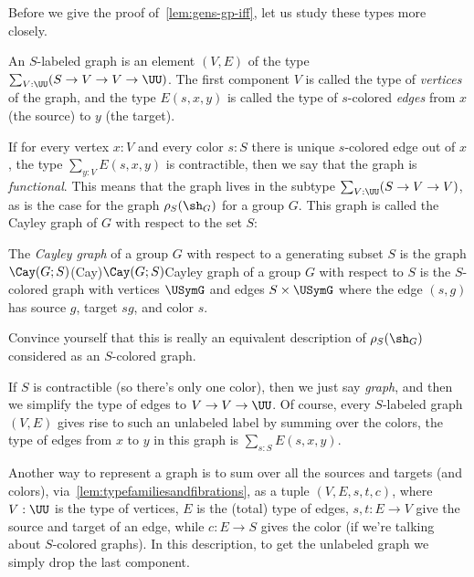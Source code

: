 Before we give the proof of~\cref{lem:gens-gp-iff}, let us study these types more closely.
\begin{definition}
  An $S$-labeled graph is an element $(V,E)$ of the type
  $\sum_{V:\UU}(S \to V \to V \to \UU)$.%
  The first component $V$ is called the type of \emph{vertices} of the graph,
  and the type $E(s,x,y)$ is called the type of $s$-colored \emph{edges}
  from $x$ (the source) to $y$ (the target).
\end{definition}
If for every vertex $x:V$ and every color $s:S$ there is unique $s$-colored edge out of $x$, \ie the type $\sum_{y:V}E(s,x,y)$ is contractible, then we say that the graph
is \emph{functional}. This means that the graph lives in the subtype $\sum_{V:\UU}(S \to V \to V)$,
as is the case for the graph $\rho_S(\sh_G)$ for a group $G$.
This graph is called the Cayley graph of $G$ with respect to the set $S$:
\begin{definition}\label{def:cayley-graph}
  The \emph{Cayley graph}
  of a group $G$ with respect to a generating subset $S$
  is the graph $\Cay(G;S)$\glossary(Cay){$\protect\Cay(G;S)$}{Cayley graph of a group $G$
  with respect to $S$}
  is the $S$-colored graph with vertices $\USymG$
  and edges $S \times \USymG$ where the edge $(s,g)$ has source $g$, target $sg$,
  and color $s$.
\end{definition}
Convince yourself that this is really an equivalent description of $\rho_S(\sh_G)$
considered as an $S$-colored graph.

If $S$ is contractible (so there's only one color), then we just say \emph{graph},
and then we simplify the type of edges to $V \to V \to \UU$.
Of course, every $S$-labeled graph $(V,E)$ gives rise to such an unlabeled label
by summing over the colors, \ie the type of edges from $x$ to $y$ in this graph
is $\sum_{s:S}E(s,x,y)$.

Another way to represent a graph is to sum over all the sources and targets (and colors),
via~\cref{lem:typefamiliesandfibrations},
\ie as a tuple $(V,E,s,t,c)$, where $V:\UU$ is the type of vertices,
$E$ is the (total) type of edges,
$s,t : E \to V$ give the source and target of an edge,
while $c: E \to S$ gives the color (if we're talking about $S$-colored graphs).
In this description, to get the unlabeled graph we simply drop the last component.

